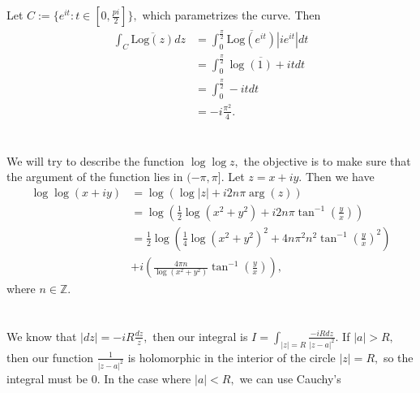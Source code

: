 \documentclass{article}
\begin{document}
\section{} %
Let $C:=\{e^{it}: t \in \left[0,\frac{pi}{2}\right]\},$ which parametrizes the curve. Then 
\begin{align*}
\int_C \overline{\text{Log}(z)} dz &= \int_{0}^{\frac{\pi}{2}}\overline{\text{Log}(e^{it})} |ie^{it}|dt\\
	&=\int_{0}^{\frac{\pi}{2}}\overline{\log(1)+it}dt\\
	&=\int_{0}^{\frac{\pi}{2}}-it dt\\
	&= -i \frac{\pi^2}{4}.
\end{align*}

\section{} %
\section{} %
\section{} %
We will try to describe the function $\log \log z,$ the objective is to make sure that the argument of the function lies in $(-\pi,\pi].$ 
Let $z=x+iy.$ Then we have 
\begin{align*}
	\log \log (x+iy) &= \log \left( \log |z| + i 2n\pi \arg(z)  \right)\\
	&= \log \left( \frac{1}{2} \log (x^2+y^2) + i 2n\pi \tan^{-1}\left(\frac{y}{x}\right)  \right)\\
	&= \frac{1}{2} \log \left( \frac{1}{4} \log \left(x^2+y^2\right)^2 +4n\pi^2n^2 \tan^{-1}\left(\frac{y}{x}\right)^2 \right) \\
	&+ i\left( \frac{4\pi n}{\log (x^2+y^2)}\tan^{-1}\left(\frac{y}{x}\right) \right),
\end{align*}
where $n \in \mathbb{Z}.$ 
\section{} %
We know that $|dz| = -iR \frac{dz}{z},$  then our integral is $I=\int_{|z|=R}\frac{-iRdz}{|z-a|^2}.$ If $|a| > R,$ then our function $\frac{1}{|z-a|^2}$ is 
holomorphic in the interior of the circle $|z|=R,$ so the integral must be $0.$ In the case where $|a| < R,$ we can use Cauchy's  
\end{document}
